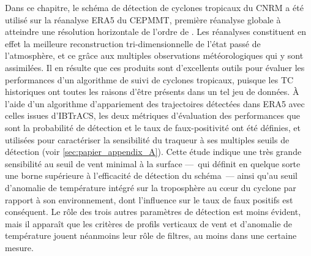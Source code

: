 \documentclass[../main.tex]{subfiles}
\begin{document}
Dans ce chapitre, le schéma de détection de cyclones tropicaux du CNRM a été utilisé sur la réanalyse ERA5 du CEPMMT, première
réanalyse globale à atteindre une résolution horizontale de l'ordre de . Les réanalyses constituent en effet la meilleure reconstruction tri-dimensionnelle de l'état
passé de l'atmosphère, et ce grâce aux multiples observations météorologiques qui y sont assimilées. Il en résulte que ces produits sont d'excellents outils
pour évaluer les performances d'un algorithme de suivi de cyclones tropicaux, puisque les TC historiques ont toutes les raisons d'être présents dans un tel jeu
de données. À l'aide d'un algorithme d'appariement des trajectoires détectées dans ERA5 avec celles issues d'IBTrACS, les deux métriques d'évaluation des
performances que sont la probabilité de détection et le taux de faux-positivité ont été définies, et utilisées pour caractériser la sensibilité du traqueur à
ses multiples seuils de détection (voir \cref{sec:papier_appendix_A}). Cette étude indique une très grande sensibilité au seuil de vent minimal à la surface
---~qui définit en quelque sorte une borne supérieure à l'efficacité de détection du schéma~--- ainsi qu'au seuil d'anomalie de température intégré sur la
troposphère au cœur du cyclone par rapport à son environnement, dont l'influence sur le taux de faux positifs est conséquent. Le rôle des trois autres
paramètres de détection est moins évident, mais il apparaît que les critères de profils verticaux de vent et d'anomalie de température jouent néanmoins leur
rôle de filtres, au moins dans une certaine mesure.
\end{document}
